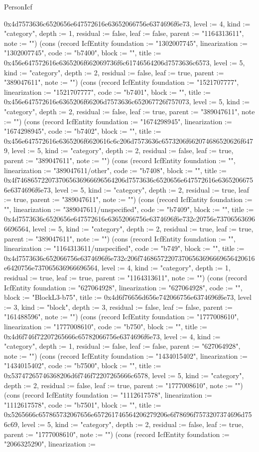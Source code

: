 \begin{lexlean}{PersonIcf}
\begin{semanticmodule}
{0x4d7573636c6520656e647572616e63652066756e6374696f6e73, level := 4, kind := "category", depth := 1, residual := false, leaf := false, parent := "1164313611", note := ""}) (cons (record IcfEntity {foundation := "1302007745", linearization := "1302007745", code := "b7400", block := "", title := 0x456e647572616e6365206f662069736f6c61746564206d7573636c6573, level := 5, kind := "category", depth := 2, residual := false, leaf := true, parent := "389047611", note := ""}) (cons (record IcfEntity {foundation := "1521707777", linearization := "1521707777", code := "b7401", block := "", title := 0x456e647572616e6365206f66206d7573636c652067726f757073, level := 5, kind := "category", depth := 2, residual := false, leaf := true, parent := "389047611", note := ""}) (cons (record IcfEntity {foundation := "1674298945", linearization := "1674298945", code := "b7402", block := "", title := 0x456e647572616e6365206f6620616c6c206d7573636c6573206f662074686520626f6479, level := 5, kind := "category", depth := 2, residual := false, leaf := true, parent := "389047611", note := ""}) (cons (record IcfEntity {foundation := "", linearization := "389047611/other", code := "b7408", block := "", title := 0x4f7468657220737065636966696564206d7573636c6520656e647572616e63652066756e6374696f6e73, level := 5, kind := "category", depth := 2, residual := true, leaf := true, parent := "389047611", note := ""}) (cons (record IcfEntity {foundation := "", linearization := "389047611/unspecified", code := "b7409", block := "", title := 0x4d7573636c6520656e647572616e63652066756e6374696f6e732c20756e737065636966696564, level := 5, kind := "category", depth := 2, residual := true, leaf := true, parent := "389047611", note := ""}) (cons (record IcfEntity {foundation := "", linearization := "1164313611/unspecified", code := "b749", block := "", title := 0x4d7573636c652066756e6374696f6e732c206f746865722073706563696669656420616e6420756e737065636966696564, level := 4, kind := "category", depth := 1, residual := true, leaf := true, parent := "1164313611", note := ""}) (cons (record IcfEntity {foundation := "627064928", linearization := "627064928", code := "", block := "BlockL3-b75", title := 0x4d6f76656d656e742066756e6374696f6e73, level := 3, kind := "block", depth := 3, residual := false, leaf := false, parent := "161488596", note := ""}) (cons (record IcfEntity {foundation := "1777008610", linearization := "1777008610", code := "b750", block := "", title := 0x4d6f746f72207265666c65782066756e6374696f6e73, level := 4, kind := "category", depth := 1, residual := false, leaf := false, parent := "627064928", note := ""}) (cons (record IcfEntity {foundation := "1434015402", linearization := "1434015402", code := "b7500", block := "", title := 0x53747265746368206d6f746f72207265666c6578, level := 5, kind := "category", depth := 2, residual := false, leaf := true, parent := "1777008610", note := ""}) (cons (record IcfEntity {foundation := "1112617578", linearization := "1112617578", code := "b7501", block := "", title := 0x5265666c657865732067656e657261746564206279206e6f78696f7573207374696d756c69, level := 5, kind := "category", depth := 2, residual := false, leaf := true, parent := "1777008610", note := ""}) (cons (record IcfEntity {foundation := "2066325290", linearization := }
\end{semanticmodule}
\end{lexlean}

